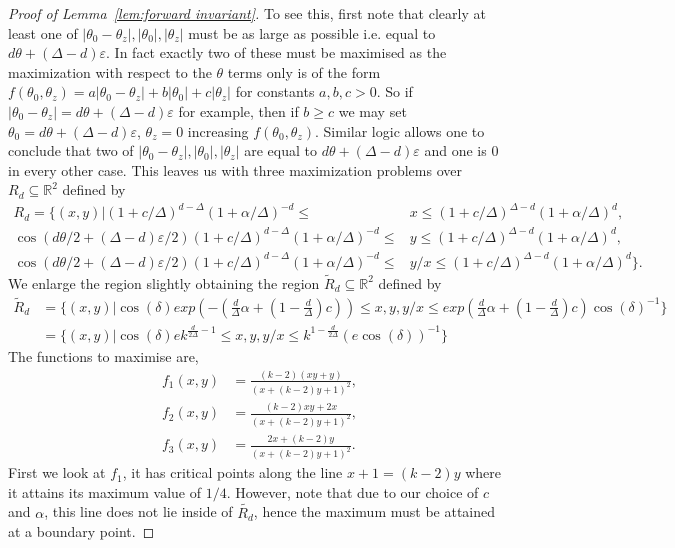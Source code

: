 \documentclass[10pt,a4paper]{article}
\theoremstyle{definition}
\newcommand*{\RR}{\mathbb{R}}
\newcommand*{\eps}{\varepsilon}
\begin{document}
\begin{proof}[Proof of Lemma~\ref{lem:forward invariant}]
To see this, first note that clearly at least one of $|\theta_0 - \theta_z|, |\theta_0|, |\theta_z|$ must be as large as possible i.e. equal to $d\theta +(\Delta-d)\eps$.
In fact exactly two of these must be maximised as the maximization with respect to the $\theta$ terms only is of the form $f(\theta_0,\theta_z)=a|\theta_0 - \theta_z|+b|\theta_0| +c|\theta_z|$ for constants $a,b,c>0$.
So if $|\theta_0 - \theta_z| = d\theta +(\Delta-d)\eps$ for example, then if $b\geq c$ we may set $\theta_0=d\theta +(\Delta-d)\eps$, $\theta_z=0$ increasing $f(\theta_0,\theta_z)$.
Similar logic allows one to conclude that two of $|\theta_0 - \theta_z|, |\theta_0|, |\theta_z|$ are equal to $d\theta +(\Delta-d)\eps$ and one is $0$ in every other case.
%
This leaves us with three maximization problems over $R_d \subseteq \RR^2$ defined by 
\begin{align*}
 R_d = \{(x,y) |  (1+c/\Delta)^{d-\Delta}(1+\alpha/\Delta)^{-d} \leq & x \leq(1+c/\Delta)^{\Delta-d}(1+\alpha/\Delta)^{d} , \\
  \cos(d\theta/2+(\Delta-d)\eps/2)(1+c/\Delta)^{d-\Delta}(1+\alpha/\Delta)^{-d} \leq & y \leq (1+c/\Delta)^{\Delta-d}(1+\alpha/\Delta)^{d}, \\
  \cos(d\theta/2+(\Delta-d)\eps/2)(1+c/\Delta)^{d-\Delta}(1+\alpha/\Delta)^{-d} \leq & y/x\leq (1+c/\Delta)^{\Delta-d}(1+\alpha/\Delta)^{d}\}.
\end{align*}
We enlarge the region slightly obtaining the region $\widetilde{R}_d \subseteq \RR^2$ defined by
\begin{align*}
 \widetilde{R}_d & = \{(x,y) | \cos(\delta)exp(-(\frac{d}{\Delta} \alpha + (1-\frac{d}{\Delta})c)) \leq x, y, y/x \leq  exp(\frac{d}{\Delta} \alpha + (1-\frac{d}{\Delta})c)\cos(\delta)^{-1}\} \\
 & = \{(x,y) | \cos(\delta)e k^{\frac{d}{2\Delta}-1} \leq x, y, y/x \leq  k^{1-\frac{d}{2\Delta}}(e\cos(\delta))^{-1} \}
\end{align*}
The functions to maximise are,
\begin{align*}
 f_1(x,y) & =\frac{(k-2)(xy+y)}{(x+(k-2)y+1)^2}, \\
 f_2(x,y) & =\frac{(k-2)xy+2x}{(x+(k-2)y+1)^2}, \\
 f_3(x,y) & =\frac{2x+(k-2)y}{(x+(k-2)y+1)^2}.
\end{align*}
%
%
First we look at $f_1$, it has critical points along the line $x+1=(k-2)y$ where it attains its maximum value of $1/4$.
However, note that due to our choice of $c$ and $\alpha$, this line does not lie inside of $\widetilde{R_d}$, hence the maximum must be attained at a boundary point.

\end{proof}
\end{document}
